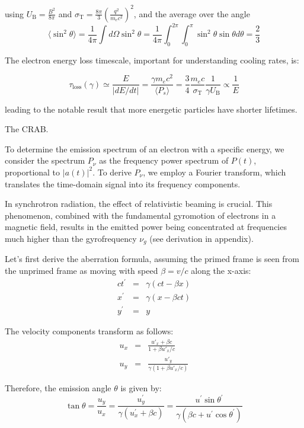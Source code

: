using \( U_{\text{B}} = \frac{B^2}{8\pi} \) and \( \sigma_{\text{T}} = \frac{8\pi}{3} \left( \frac{q^2}{m_e c^2} \right)^2 \), and the average over the angle
%
\[
\langle \sin^2 \theta \rangle = \frac{1}{4\pi} \int d\Omega \sin^2 \theta = \frac{1}{4\pi} \int_0^{2\pi} \int_0^\pi \sin^2 \theta \sin \theta d\theta = \frac{2}{3}
\]

The electron energy loss timescale, important for understanding cooling rates, is:
%
\begin{remark}
\[
\tau_{\text{loss}} (\gamma) \simeq \frac{E}{| dE/dt |} = \frac{\gamma m_e c^2}{\langle P_s \rangle} = \frac{3}{4} \frac{m_e c}{\sigma_{\text{T}}} \frac{1}{\gamma U_{\text{B}}} \propto \frac{1}{E}
\]
\end{remark}
%
leading to the notable result that more energetic particles have shorter lifetimes.

\begin{problem}
The CRAB.
\end{problem}

To determine the emission spectrum of an electron with a specific energy, we consider the spectrum \( P_\nu \) as the frequency power spectrum of \( P(t) \), proportional to \( |a(t)|^2 \). To derive \( P_\nu \), we employ a Fourier transform, which translates the time-domain signal into its frequency components.

In synchrotron radiation, the effect of relativistic beaming is crucial. This phenomenon, combined with the fundamental gyromotion of electrons in a magnetic field, results in the emitted power being concentrated at frequencies much higher than the gyrofrequency \( \nu_g \) (see derivation in appendix).

Let's first derive the aberration formula, assuming the primed frame is seen from the unprimed frame as moving with speed $\beta = v/c$ along the x-axis:
%
\begin{eqnarray*}
c t^\prime & = & \gamma (c t - \beta x) \\
x^\prime & = & \gamma (x - \beta c t) \\
y^\prime & = & y 
\end{eqnarray*}

The velocity components transform as follows:
%
\begin{eqnarray*}
u_x & = & \frac{u'_x + \beta c}{1+\beta u'_x / c} \\
u_y & = & \frac{u'_y}{\gamma(1+\beta u'_x / c)} 
\end{eqnarray*}

Therefore, the emission angle \( \theta \) is given by:
%
\[
\tan \theta = \frac{u_y}{u_x} = \frac{u^\prime_y}{\gamma(u^\prime_x + \beta c)} = \frac{u^\prime \sin \theta^\prime}{\gamma(\beta c + u^\prime \cos \theta^\prime)} 
\]

